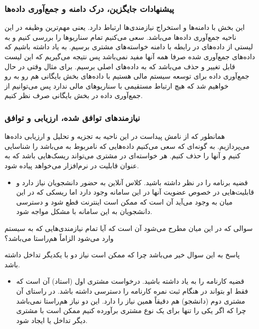 \subsubsection{پیشنهادات جایگزین، درک دامنه و جمع‌آوری داده‌ها}

این بخش با دامنه‌ها و استخراج نیازمندی‌ها ارتباط دارد. یعنی مهم‌ترین وظیفه در
این ناحیه جمع‌آوری داده‌ها می‌باشد. سعی می‌کنیم تمام سناریو‌ها را بررسی کنیم و
به لیستی از داده‌های در رابطه با دامنه خواسته‌های مشتری برسیم. به یاد داشته
باشیم که داده‌های جمع‌آوری شده صرفا همه آنها مفید نمی‌باشد پس نتیجه می‌گیریم که
این لیست قابل تغییر و حذف می‌باشد که به داده‌های اصلی برسیم. برای مثال وقتی در
حال جمع‌آوری داده برای توسعه سیستم مالی هستیم با داده‌های بخش بایگانی هم رو به
رو خواهیم شد که هیچ ارتباط مستقیمی با سناریو‌های مالی ندارد پس می‌توانیم از
جمع‌آوری داده در بخش بایگانی صرف نظر کنیم.

\subsubsection{نیازمند‌های توافق شده، ارزیابی و توافق}

همانطور که از نامش پیداست در این ناحیه به تجزیه و تحلیل و ارزیابی داده‌ها
می‌پردازیم. به گونه‌ای که سعی می‌کنیم داده‌هایی که نامربوط به  می‌باشد
را شناسایی کنیم و آنها را حذف کنیم. هر خواسته‌ای در  مشتری می‌تواند
ریسک‌هایی باشد که به عنوان قابلیت در نرم‌افزار می‌خواهد پیاده شود.

\begin{itemize}
    \item قضیه برنامه  را در نظر داشته باشید. کلاس آنلاین به حضور
    دانشجویان نیاز دارد و قابلیت‌هایی در خصوص عضویت آنها در این سامانه وجود دارد
    اما ریسکی که در این میان به وجود می‌آید آن است که ممکن است اینترنت قطع شود و
    دسترسی دانشجویان به این سامانه با مشکل مواجه شود.
\end{itemize}

سوالی که در این میان مطرح می‌شود آن است که آیا تمام نیازمندی‌هایی که به سیستم
وارد می‌شود الزاماً هم‌راستا می‌باشد؟

پاسخ به این سوال خیر می‌باشد چرا که ممکن است نیاز دو  با یکدیگر
تداخل داشته باشد.

\begin{itemize}
    \item قضیه کارنامه را به یاد داشته باشید. درخواست مشتری اول (استاد) آن است
    که فقط او بتواند در هنگام ثبت نمره کارنامه را دسترسی داشته باشد. در راستای
    آن مشتری دوم (دانشجو) هم دقیقاً همین نیاز را دارد. این دو نیاز هم‌راستا
    نمی‌باشد چرا که اگر یکی را تنها برای یک نوع مشتری برآورده کنیم ممکن است با
    مشتری دیگر تداخل یا  ایجاد شود.
\end{itemize}

